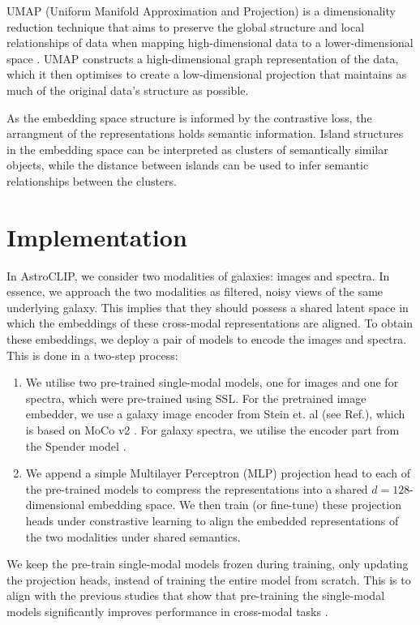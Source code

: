 \documentclass[a4paper,12pt]{article}
\begin{document}
UMAP (Uniform Manifold Approximation and Projection) is a dimensionality reduction technique that aims to preserve the global structure and local relationships of data when mapping high-dimensional data to a lower-dimensional space \cite{UMAP}. UMAP constructs a high-dimensional graph representation of the data, which it then optimises to create a low-dimensional projection that maintains as much of the original data's structure as possible. 

As the embedding space structure is informed by the contrastive loss, the arrangment of the representations holds semantic information. Island structures in the embedding space can be interpreted as clusters of semantically similar objects, while the distance between islands can be used to infer semantic relationships between the clusters.


\section{Implementation}
In AstroCLIP, we consider two modalities of galaxies: images and spectra. In essence, we approach the two modalities as filtered, noisy views of the same underlying galaxy. This implies that they should possess a shared latent space in which the embeddings of these cross-modal representations are aligned. To obtain these embeddings, we deploy a pair of models to encode the images and spectra. This is done in a two-step process:
\begin{enumerate}
    \item We utilise two pre-trained single-modal models, one for images and one for spectra, which were pre-trained using SSL. For the pretrained image embedder, we use a galaxy image encoder from Stein et. al (see Ref.\cite{stein}), which is based on MoCo v2 \cite{mocov2}. For galaxy spectra, we utilise the encoder part from the Spender model \cite{spender}.
    \item We append a simple Multilayer Perceptron (MLP) projection head to each of the pre-trained models to compress the representations into a shared $d=128$-dimensional embedding space. We then train (or fine-tune) these projection heads under constrastive learning to align the embedded representations of the two modalities under shared semantics.
\end{enumerate}
We keep the pre-train single-modal models frozen during training, only updating the projection heads, instead of training the entire model from scratch. This is to align with the previous studies that show that pre-training the single-modal models significantly improves performance in cross-modal tasks \cite{crossCLIP}.
\end{document}
